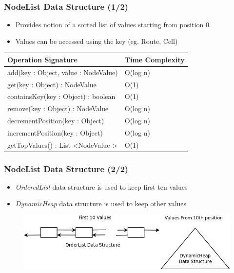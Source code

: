 \documentclass[handout]{beamer}
\begin{document}
\begin{frame}
\frametitle{NodeList Data Structure (1/2)}

\begin{itemize}
        \item Provides notion of a sorted list of values starting from position 0
        \item Values can be accessed using the key (eg. Route, Cell)
\end{itemize}

\begin{table}
\centering
\begin{tabular}{|l|l|} \hline
Operation Signature & Time Complexity \\ \hline \hline
add(key : Object, value : NodeValue) & O(log n) \\ \hline
get(key : Object) : NodeValue & O(1) \\ \hline
containsKey(key : Object) : boolean & O(1) \\ \hline
remove(key : Object) : NodeValue & O(log n) \\ \hline
decrementPosition(key : Object) & O(log n) \\ \hline
incrementPosition(key : Object) & O(log n) \\ \hline
getTopValues() : List \textless NodeValue \textgreater & O(1) \\ \hline
\end{tabular}
\end{table}

\end{frame}

\begin{frame}
\frametitle{NodeList Data Structure (2/2)}

\begin{itemize}
        \item \textit{OrderedList} data structure is used to keep first ten values
        \item \textit{DynamicHeap} data structure is used to keep other values
\end{itemize}

\begin{figure}
        \includegraphics[width=0.8\linewidth]{nodeliststruct.png}
\end{figure}

\end{frame}
\end{document}
